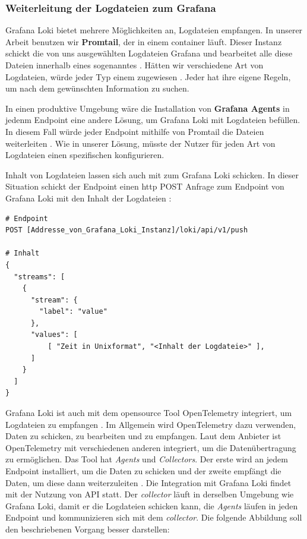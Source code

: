 \subsubsection{Weiterleitung der Logdateien zum Grafana}
Grafana Loki bietet mehrere Möglichkeiten an, Logdateien empfangen. In unserer Arbeit benutzen wir \textbf{Promtail}, der in einem \gls{container} läuft. Dieser Instanz schickt die von uns ausgewählten Logdateien Grafana und bearbeitet alle diese Dateien innerhalb eines sogenanntes . Hätten wir verschiedene Art von Logdateien, würde jeder Typ einem  zugewiesen \citep{Grafana_CollectLogs}. Jeder  hat ihre eigene Regeln, um nach dem gewünschten Information zu suchen. 

In einen produktive Umgebung wäre die Installation von \textbf{Grafana Agents} in jedenm \gls{Endpoint} eine andere Lösung, um Grafana Loki mit  Logdateien befüllen. In diesem Fall würde jeder \gls{Endpoint} 
mithilfe von Promtail die Dateien weiterleiten \citep{Grafana_Agents}. Wie in unserer Lösung, müsste der Nutzer für jeden Art von Logdateien einen spezifischen  konfigurieren. 

Inhalt von Logdateien lassen sich auch mit \textbf{} zum Grafana Loki schicken. In dieser Situation schickt der \gls{Endpoint} einen \gls{http} POST Anfrage zum \gls{Endpoint} von Grafana Loki mit den Inhalt der Logdateien \citep{Grafana_api}:

{
\begin{Verbatim}[frame=single]
# Endpoint 
POST [Addresse_von_Grafana_Loki_Instanz]/loki/api/v1/push

# Inhalt
{
  "streams": [
    {
      "stream": {
        "label": "value"
      },
      "values": [
          [ "Zeit in Unixformat", "<Inhalt der Logdateie>" ],
      ]
    }
  ]
}
\end{Verbatim}
}

Grafana Loki ist auch mit dem \gls{opensource} Tool OpenTelemetry  integriert, um Logdateien zu empfangen \citep{Grafana_opentelemtry}. Im Allgemein wird OpenTelemetry dazu verwenden, Daten zu schicken, zu bearbeiten und zu empfangen. Laut dem Anbieter ist OpenTelemetry mit verschiedenen anderen integriert, um die Datenübertragung zu ermöglichen. Das Tool hat \textit{Agents} und \textit{Collectors}. Der erste wird an jedem \gls{Endpoint} installiert, um die Daten zu schicken und der zweite empfängt die Daten, um diese dann weiterzuleiten \citep{Grafana_opentelemtry}. Die Integration mit Grafana Loki findet mit der Nutzung von \gls{API} statt. Der \textit{collector} läuft in derselben Umgebung wie Grafana Loki, damit er die Logdateien schicken kann, die \textit{Agents} läufen in jeden \gls{Endpoint} und kommunizieren sich mit dem \textit{collector}. Die folgende Abbildung soll den beschriebenen Vorgang besser darstellen:


